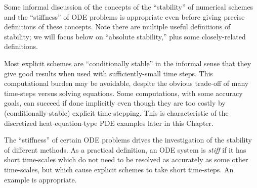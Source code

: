 Some informal discussion of the concepts of the ``stability'' of numerical schemes and the ``stiffness'' of ODE problems is appropriate even before giving precise definitions of these concepts.  Note there are multiple useful definitions of stability; we will focus below on ``absolute stability,'' plus some closely-related definitions.

Most explicit schemes are ``conditionally stable'' in the informal sense that they give good results when used with sufficiently-small time steps.  This computational burden may be avoidable, despite the obvious trade-off of many time-steps versus solving equations.  Some computations, with some accuracy goals, can succeed if done implicitly even though they are too costly by (conditionally-stable) explicit time-stepping.  This is characteristic of the discretized heat-equation-type PDE examples later in this Chapter.

The ``stiffness'' of certain ODE problems drives the investigation of the stability of different methods.  As a practical definition, an ODE system is \emph{stiff} if it has short time-scales which do not need to be resolved as accurately as some other time-scales, but which cause explicit schemes to take short time-steps.  An example is appropriate.

